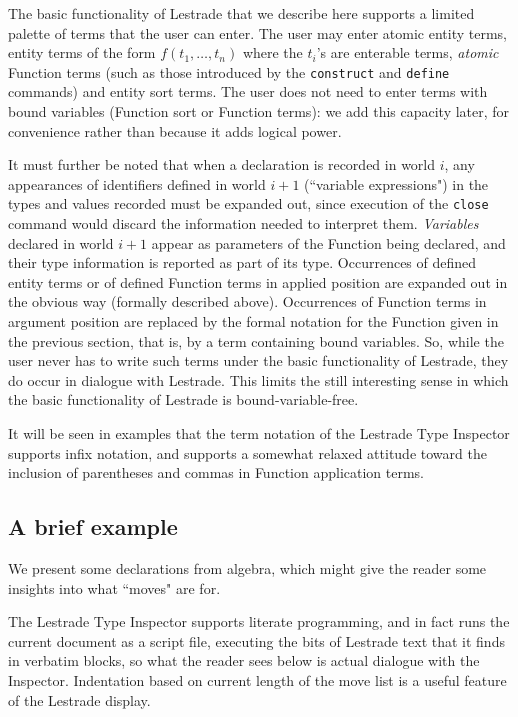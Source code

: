 \documentclass{article}
\begin{document}
The basic functionality of Lestrade that we describe here supports a limited palette of terms that the user can enter.  The user may enter atomic entity terms,
entity terms of the form $f(t_1,\ldots,t_n)$ where the $t_i$'s are enterable terms, {\em atomic\/} Function terms (such as those introduced by the {\tt construct} and {\tt define} commands) and entity sort terms.  The user does not need to enter terms with bound variables (Function sort or Function terms):  we add this capacity later, for convenience rather than because it adds logical power. 

It must further be noted that when a declaration is recorded in world $i$, any appearances of identifiers defined in world $i+1$ (``variable expressions") in the types and values recorded must be expanded out, since
execution of the {\tt close} command would discard the information needed to interpret them.  {\em Variables\/} declared in world $i+1$ appear as parameters of the Function being declared, and their type information is reported as part of its type.   Occurrences of defined entity terms or of defined Function terms in applied position are expanded out in the obvious way (formally described above).   Occurrences of Function terms in argument position are replaced by the formal notation for the Function given in the previous section, that is, by a term containing bound variables.  So, while the user never has to write such terms under the basic functionality of Lestrade, they do occur in dialogue with Lestrade.  This limits the still interesting sense in which the basic functionality of Lestrade is bound-variable-free.

It will be seen in examples that the term notation of the Lestrade Type Inspector supports infix notation, and supports a somewhat relaxed attitude toward the inclusion of parentheses and commas in Function application terms.


\subsection{A brief example}

We present some declarations from algebra, which might give the reader some insights into what ``moves" are for.

The Lestrade Type Inspector supports literate programming, and in fact runs the current document as a script file, executing the bits of Lestrade text that it finds in verbatim blocks, so what the reader sees below is actual dialogue with the Inspector.  Indentation based on current length of the move list is a useful feature of the Lestrade display.
\end{document}
